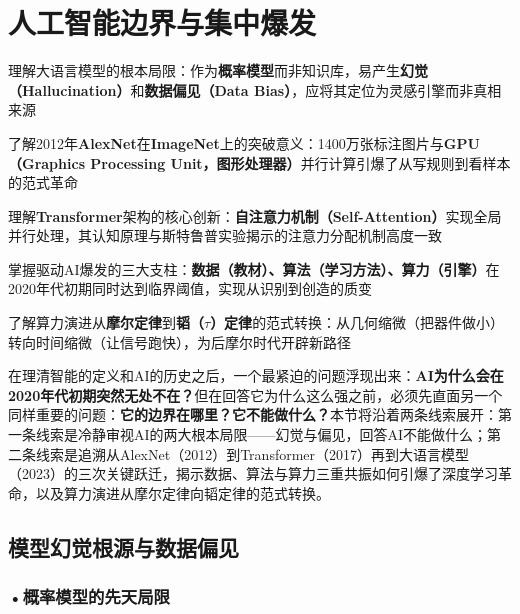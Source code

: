 \newpage

\section{人工智能边界与集中爆发}

\begin{sectionkeypoints}
\item 理解大语言模型的根本局限：作为\textbf{概率模型}而非知识库，易产生\textbf{幻觉（Hallucination）}和\textbf{数据偏见（Data Bias）}，应将其定位为灵感引擎而非真相来源
\item 了解2012年\textbf{AlexNet}在\textbf{ImageNet}上的突破意义：1400万张标注图片与\textbf{GPU（Graphics Processing Unit，图形处理器）}并行计算引爆了从写规则到看样本的范式革命
\item 理解\textbf{Transformer}架构的核心创新：\textbf{自注意力机制（Self-Attention）}实现全局并行处理，其认知原理与斯特鲁普实验揭示的注意力分配机制高度一致
\item 掌握驱动AI爆发的三大支柱：\textbf{数据（教材）、算法（学习方法）、算力（引擎）}在2020年代初期同时达到临界阈值，实现从识别到创造的质变
\item 了解算力演进从\textbf{摩尔定律}到\textbf{韬（$\tau$）定律}的范式转换：从几何缩微（把器件做小）转向时间缩微（让信号跑快），为后摩尔时代开辟新路径
\end{sectionkeypoints}

在理清智能的定义和AI的历史之后，一个最紧迫的问题浮现出来：\textbf{AI为什么会在2020年代初期突然无处不在？}但在回答它为什么这么强之前，必须先直面另一个同样重要的问题：\textbf{它的边界在哪里？它不能做什么？}本节将沿着两条线索展开：第一条线索是冷静审视AI的两大根本局限——幻觉与偏见，回答AI不能做什么；第二条线索是追溯从AlexNet（2012）到Transformer（2017）再到大语言模型（2023）的三次关键跃迁，揭示数据、算法与算力三重共振如何引爆了深度学习革命，以及算力演进从摩尔定律向韬定律的范式转换。

\subsection{模型幻觉根源与数据偏见}

\subsubsection*{\textbf{•概率模型的先天局限}}

